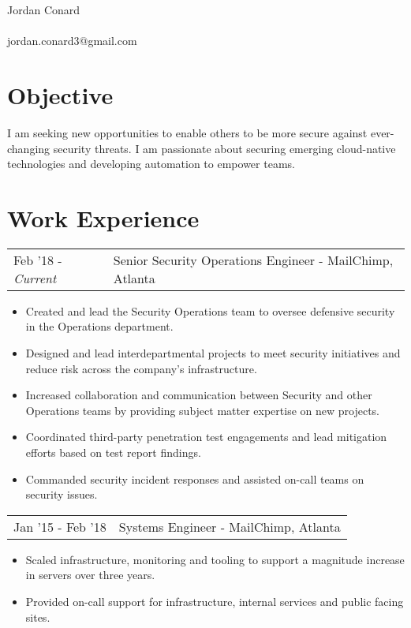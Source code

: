 \documentclass[letterpaper]{article}
\begin{document}
\pagestyle{empty} %


\begin{center}
    {\Huge Jordan Conard}\\~\\
    jordan.conard3@gmail.com\\
\end{center}

\section*{Objective}
I am seeking new opportunities to enable others to be more secure against ever-changing security threats. I am passionate about securing emerging cloud-native technologies and developing automation to empower teams. 

\section*{Work Experience}
\begin{tabular}{l|l}
{Feb '18 - \emph{Current}} & Senior Security Operations Engineer - MailChimp, Atlanta\\
\end{tabular}
\begin{itemize}[noitemsep]
	\item Created and lead the Security Operations team to oversee defensive security in the Operations department.
	\item Designed and lead interdepartmental projects to meet security initiatives and reduce risk across the company's infrastructure.
	\item Increased collaboration and communication between Security and other Operations teams by providing subject matter expertise on new projects.
	\item Coordinated third-party penetration test engagements and lead mitigation efforts based on test report findings.
	\item Commanded security incident responses and assisted on-call teams on security issues.
\end{itemize}
\begin{tabular}{l|l}
{Jan '15 - Feb '18} & Systems Engineer - MailChimp, Atlanta\\
\end{tabular}
\begin{itemize}[noitemsep]
	\item Scaled infrastructure, monitoring and tooling to support a magnitude increase in servers over three years.
	\item Provided on-call support for infrastructure, internal services and public facing sites.
\end{itemize}
\end{document}
